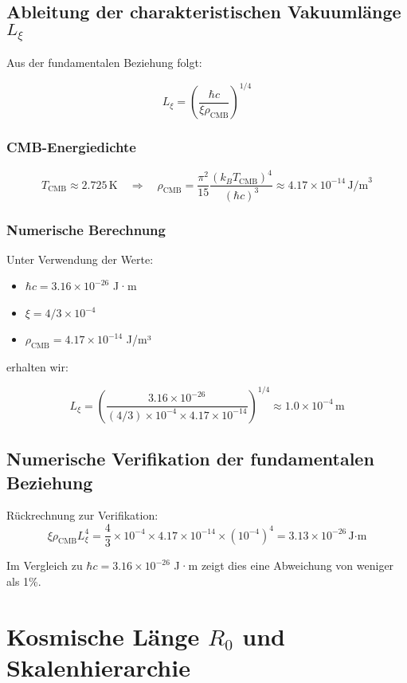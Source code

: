 \documentclass[12pt,a4paper]{article}
\numberwithin{equation}{section}
\begin{document}
	\subsection{Ableitung der charakteristischen Vakuumlänge $L_\xi$}
	
	Aus der fundamentalen Beziehung folgt:
	
	\[
	L_\xi = \left(\frac{\hbar c}{\xi \rho_{\text{CMB}}}\right)^{1/4}
	\]
	
	\subsubsection{CMB-Energiedichte}
	
	\[
	T_{\text{CMB}} \approx 2.725\,\text{K} \quad \Rightarrow \quad \rho_{\text{CMB}} = \frac{\pi^2}{15} \frac{(k_B T_{\text{CMB}})^4}{(\hbar c)^3} \approx 4.17 \times 10^{-14}\, \text{J/m}^3
	\]
	
	\subsubsection{Numerische Berechnung}
	
	Unter Verwendung der Werte:
	\begin{itemize}
		\item $\hbar c = 3.16 \times 10^{-26}$ J·m
		\item $\xi = 4/3 \times 10^{-4}$
		\item $\rho_{\text{CMB}} = 4.17 \times 10^{-14}$ J/m³
	\end{itemize}
	
	erhalten wir:
	
	\[
	L_\xi = \left(\frac{3.16 \times 10^{-26}}{(4/3) \times 10^{-4} \times 4.17 \times 10^{-14}}\right)^{1/4} \approx 1.0 \times 10^{-4}\,\text{m}
	\]
	
	\subsection{Numerische Verifikation der fundamentalen Beziehung}
	
	Rückrechnung zur Verifikation:
	\[
	\xi \rho_{\text{CMB}} L_\xi^4 = \frac{4}{3} \times 10^{-4} \times 4.17 \times 10^{-14} \times (10^{-4})^4 = 3.13 \times 10^{-26}\,\text{J·m}
	\]
	
	Im Vergleich zu $\hbar c = 3.16 \times 10^{-26}$ J·m zeigt dies eine Abweichung von weniger als 1\%.
	
	\section{Kosmische Länge $R_0$ und Skalenhierarchie}
	
\end{document}
